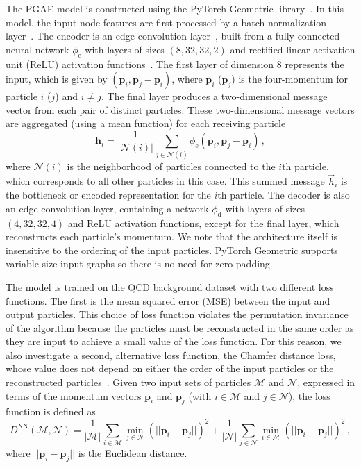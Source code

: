 \documentclass[a4paper,11pt]{article}
\begin{document}
The PGAE model is constructed using the PyTorch Geometric library~\cite{PyTorchGeometric}.
In this model, the input node features are first processed by a batch normalization layer~\cite{batchnorm}.
The encoder is an edge convolution layer~\cite{DGCNN}, built from a fully connected neural network $\phi_\mathrm{e}$ with layers of sizes $(8, 32, 32, 2)$ and rectified linear activation unit (ReLU) activation functions~\cite{relu}.
The first layer of dimension $8$ represents the input, which is given by $(\boldsymbol{p}_i, \boldsymbol{p}_j-\boldsymbol{p}_i)$, where $\boldsymbol{p}_i$ ($\boldsymbol{p}_j$) is the four-momentum for particle $i$ ($j$) and $i\neq j$.
The final layer produces a two-dimensional message vector from each pair of distinct particles.
These two-dimensional message vectors are aggregated (using a mean function) for each receiving particle
\begin{equation}
\boldsymbol{h}_i = \frac{1}{|\mathcal N(i)|}\sum_{j\in \mathcal N(i)} \phi_\mathrm{e}(\boldsymbol{p}_i, \boldsymbol{p}_j-\boldsymbol{p}_i)\,,
\end{equation}
where $\mathcal N(i)$ is the neighborhood of particles connected to the $i$th particle, which corresponds to all other particles in this case.
This summed message $\vec h_i$ is the bottleneck or encoded representation for the $i$th particle.
The decoder is also an edge convolution layer, containing a network $\phi_\mathrm{d}$ with layers of sizes $(4, 32, 32, 4)$ and ReLU activation functions, except for the final layer, which reconstructs each particle's momentum.
We note that the architecture itself is insensitive to the ordering of the input particles. 
PyTorch Geometric supports variable-size input graphs so there is no need for zero-padding.

The model is trained on the QCD background dataset with two different loss functions. 
The first is the mean squared error (MSE) between the input and output particles. 
This choice of loss function violates the permutation invariance of the algorithm because the particles must be reconstructed in the same order as they are input to achieve a small value of the loss function.
For this reason, we also investigate a second, alternative loss function, the Chamfer distance loss, whose value does not depend on either the order of the input particles or the reconstructed particles~\cite{10.5555/1622943.1622971,Fan_2017_CVPR,Zhang2020FSPool}.
Given two input sets of particles $\mathcal{M}$ and $\mathcal{N}$, expressed in terms of the momentum vectors $\boldsymbol{p}_i$ and $\boldsymbol{p}_j$ (with $i \in \mathcal{M}$ and $j \in \mathcal{N}$), the loss function is defined as
\begin{equation}
D^\mathrm{NN}(\mathcal{M}, \mathcal{N}) =  \frac{1}{|\mathcal{M}|}\sum_{i \in \mathcal{M}} \min_{j \in \mathcal{N}} \left(||\boldsymbol{p}_i - \boldsymbol{p}_j||\right)^2 + \frac{1}{|\mathcal{N}|}\sum_{j \in \mathcal{N}} \min_{i \in \mathcal{M}} \left(||\boldsymbol{p}_i - \boldsymbol{p}_j||\right)^2\,,
\label{eq:L_NND}
\end{equation}
where $||\boldsymbol{p}_i-\boldsymbol{p}_j||$ is the Euclidean distance.
\end{document}
